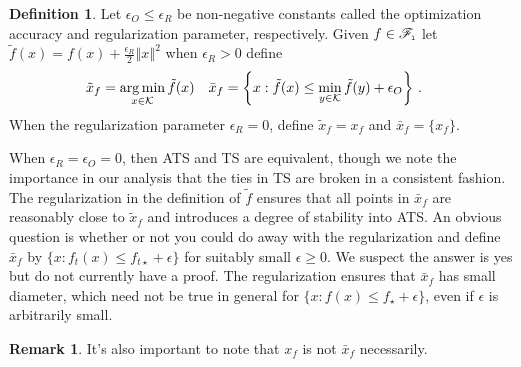 \documentclass[letter, 12pt]{report}
\newcommand{\epsR}{{\epsilon_R}}
\newcommand{\epsO}{{\epsilon_O}}
\newcommand{\pl}{\text{\tiny\texttt{l}}}
\newcommand{\argmin}{\operatornamewithlimits{arg\,min}}
\newcommand{\norm}[1]{\left \Vert  #1 \right \Vert}
\newcommand{\cK}{\mathcal K}
\newcommand{\sF}{\mathscr F}
\newcommand{\1}{\mathbf{1}}
\newcommand{\ts}{\textsc{TS}\xspace}
\newcommand{\ats}{\textsc{ATS}}
\theoremstyle{plain}
\theoremstyle{definition}
\newtheorem{definition}[theorem]{Definition}
\newtheorem{remark}[theorem]{Remark}
\theoremstyle{remark}
\begin{document}
\begin{definition}\label{def:opt}
    Let $\epsO \leq \epsR$ be non-negative constants called the optimization accuracy and regularization parameter, respectively.
    Given $f \in \sF_{\pl}$ let $\tilde f(x) = f(x) + \frac{\epsR}{2} \norm{x}^2$ when $\epsR > 0$ define
    \begin{align*}
        \tilde x_f & = \argmin_{x \in \cK} \tilde f(x)                                              &
        \bar x_f   & = \left\{x : \tilde f(x) \leq \min_{y \in \cK} \tilde f(y) + \epsO\right\} \,.
    \end{align*}
    When the regularization parameter $\epsR = 0$, define
    $\tilde x_f = x_f$
    and $\bar x_f = \{x_f\}$.
\end{definition}

When $\epsR = \epsO = 0$, then \ats{} and \ts{} are equivalent, though we note the importance in our analysis
that the ties in \ts{} are broken in a consistent fashion.
The regularization in the definition of $\tilde f$ ensures that all points in $\bar x_f$ are reasonably close to $\tilde x_f$ and introduces
a degree of stability into \ats{}.
An obvious question is whether or not you could do away with the regularization and define $\bar x_f$ by  $\{x : f_t(x) \leq f_{t\star} + \epsilon\}$
for suitably small $\epsilon \geq 0$.
We suspect the answer is yes but do not currently have a proof.
The regularization ensures that $\bar x_f$ has small diameter, which need not be true in general for $\{x : f(x) \leq f_\star + \epsilon\}$,
even if $\epsilon$ is arbitrarily small.
\begin{remark}
    It's also important to note that $x_f$ is not $\bar{x}_f$ necessarily.
\end{remark}
\end{document}
